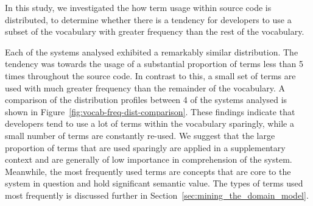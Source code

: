 In this study, we investigated the how term usage within source code is distributed, to determine whether there is a tendency for developers to use a subset of the vocabulary with greater frequency than the rest of the vocabulary.





Each of the systems analysed exhibited a remarkably similar distribution. The tendency was towards the usage of a substantial proportion of terms less than 5 times throughout the source code. In contrast to this, a small set of terms are used with much greater frequency than the remainder of the vocabulary. A comparison of the distribution profiles between 4 of the systems analysed is shown in Figure~\ref{fig:vocab-freq-dist-comparison}. These findings indicate that developers tend to use a lot of terms within the vocabulary sparingly, while a small number of terms are constantly re-used. We suggest that the large proportion of terms that are used sparingly are applied in a supplementary context and are generally of low importance in comprehension of the system. Meanwhile, the most frequently used terms are concepts that are core to the system in question and hold significant semantic value. The types of terms used most frequently is discussed further in Section~\ref{sec:mining_the_domain_model}.

